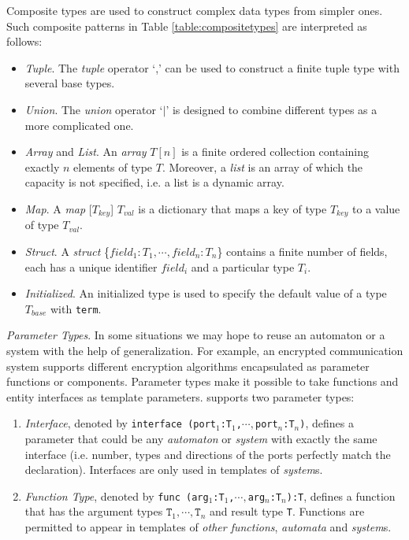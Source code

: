 Composite types are used to construct complex data types from simpler ones. Such composite patterns in Table \ref{table:compositetypes} are interpreted as follows:
\begin{itemize}
    \item \emph{Tuple}. The \emph{tuple} operator `,' can be used to construct a finite tuple type with several base types.
    \item \emph{Union}. The \emph{union} operator `$|$' is designed to combine different types as a more complicated one. 
    \item \emph{Array} and \emph{List}. An \emph{array} $T[n]$ is a finite ordered collection containing exactly $n$ elements of type $T$. Moreover, a \emph{list} is an array of which the capacity is not specified, i.e. a list is a dynamic array.
    \item \emph{Map}. A \emph{map }[$T_{key}$] $T_{val}$ is a dictionary that maps a key of type $T_{key}$ to a value of type $T_{val}$.
    \item \emph{Struct}. A \emph{struct }\{$field_1:T_1,\cdots,field_n:T_n$\} contains a finite number of fields, each has  a unique identifier $field_i$ and a particular type $T_i$.
    \item \emph{Initialized}. An initialized type is used to specify the default value of a type $T_{base}$ with \texttt{term}.
\end{itemize}

\noindent\emph{Parameter Types}. In some situations we may hope to reuse an automaton or a system with the help of generalization. For example, an encrypted communication system supports different encryption algorithms encapsulated as parameter functions or components. Parameter types make it possible to take functions and entity interfaces as template parameters. \lang{} supports two parameter types: 
\begin{enumerate}
    \item \emph{Interface}, denoted by \texttt{interface (port$_1$:T$_1$,$\cdots,$port$_n$:T$_n$)}, defines a parameter that could be any \emph{automaton} or \emph{system} with exactly the same interface (i.e. number, types and directions of the ports perfectly match the declaration). Interfaces are only used in templates of \emph{system}s.
    \item \emph{Function Type}, denoted by \texttt{func (arg$_1$:T$_1$,$\cdots, $arg$_n$:T$_n$):T}, defines a function that has the argument types $\texttt{T}_1,\cdots,\texttt{T}_n$ and result type \texttt{T}. Functions are permitted to appear in templates of \emph{other functions}, \emph{automata} and \emph{system}s.
\end{enumerate}

